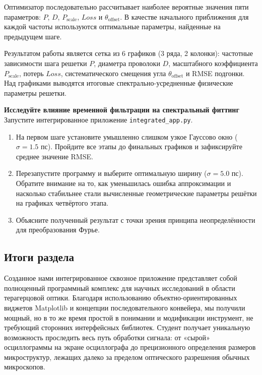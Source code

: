 Оптимизатор последовательно рассчитывает наиболее вероятные значения пяти параметров: $P$, $D$, $P_{\text{scale}}$, $Loss$ и $\theta_{\text{offset}}$. В качестве начального приближения для каждой частоты используются оптимальные параметры, найденные на предыдущем шаге.

Результатом работы является сетка из 6 графиков (3 ряда, 2 колонки): частотные зависимости шага решетки $P$, диаметра проволоки $D$, масштабного коэффициента $P_{\text{scale}}$, потерь $Loss$, систематического смещения угла $\theta_{\text{offset}}$ и RMSE подгонки. Над графиками выводятся итоговые спектрально-усредненные физические параметры решетки.


\begin{minitaskbox}
    \textbf{Исследуйте влияние временной фильтрации на спектральный фиттинг} \\
    Запустите интегрированное приложение \texttt{integrated\_app.py}. 
    \begin{enumerate}
        \item На первом шаге установите умышленно слишком узкое Гауссово окно ($\sigma = 1.5$ пс). Пройдите все этапы до финальных графиков и зафиксируйте среднее значение RMSE.
        \item Перезапустите программу и выберите оптимальную ширину ($\sigma = 5.0$ пс). Обратите внимание на то, как уменьшилась ошибка аппроксимации и насколько стабильнее стали вычисленные геометрические параметры решётки на графиках четвёртого этапа.
        \item Объясните полученный результат с точки зрения принципа неопределённости для преобразования Фурье.
    \end{enumerate}
\end{minitaskbox}

\subsection{Итоги раздела}

Созданное нами интегрированное сквозное приложение представляет собой полноценный программный комплекс для научных исследований в области терагерцовой оптики. Благодаря использованию объектно-ориентированных виджетов Matplotlib и концепции последовательного конвейера, мы получили мощный, но в то же время простой в понимании и модификации инструмент, не требующий сторонних интерфейсных библиотек. Студент получает уникальную возможность проследить весь путь обработки сигнала: от «сырой» осциллограммы на экране осциллографа до прецизионного определения размеров микроструктур, лежащих далеко за пределом оптического разрешения обычных микроскопов.
